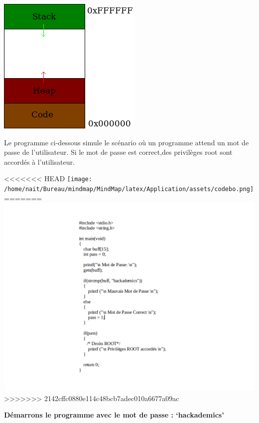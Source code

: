 \begin{center}
\includegraphics[scale=0.5]{Application/assets/stack.png}
\end{center}

\begin{flushleft}
Le programme ci-dessous simule le scénario où un programme attend un mot de passe de l'utilisateur. Si le mot de passe est correct,des privilèges root sont accordés à l'utilisateur.
\end{flushleft}

\begin{center}
<<<<<<< HEAD
\texttt{[image: /home/nait/Bureau/mindmap/MindMap/latex/Application/assets/codebo.png]}
=======
\vspace{0.5cm}
\includegraphics[scale=0.3]{Application/assets/codebo.png}
\vspace{0.5cm}
>>>>>>> 2142cffc0880e114c48bcb7adec010a6677a09ac
\end{center}

\begin{flushleft}
\textbf{Démarrons le programme avec le mot de passe : ‘hackademics'}
\end{flushleft}


